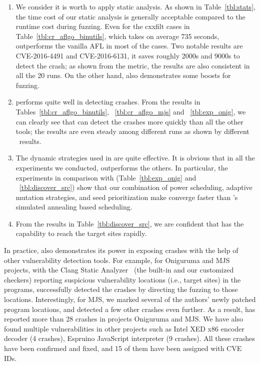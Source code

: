 \begin{enumerate}[\textbf{RQ}1]
    \item  We consider it is worth to apply static analysis. As shown in Table~\ref{tbl:stats}, the time cost of our static analysis is generally acceptable compared to the runtime cost during fuzzing. Even for the cxxfilt cases in Table~\ref{tbl:cr_aflgo_binutils}, which takes on average 735 seconds, \dFOT outperforms the vanilla AFL in most of the cases. Two notable results are CVE-2016-4491 and CVE-2016-6131, it saves roughly 2000s and 9000s to detect the crash; as shown from the {\alz} metric, the results are also consistent in all the 20 runs. On the other hand, \dFOT also demonstrates some boosts for fuzzing.
    \item  \dFOT performs quite well in detecting crashes. From the results in Tables~\ref{tbl:cr_aflgo_binutils}, ~\ref{tbl:cr_aflgo_mjs} and ~\ref{tbl:exp_onig}, we can clearly see that \dFOT can detect the crashes more quickly than all the other tools; the results are even steady among different runs as shown by different {\alz}~results.
    \item  The dynamic strategies used in \dFOT are quite effective. It is obvious that in all the experiments we conducted, \dFOT outperforms the others. In particular, the  experiments in comparison with \dGO (Table~\ref{tbl:exp_onig} and ~\ref{tbl:discover_src}) show that our combination of power scheduling, adaptive mutation strategies, and seed prioritization make \dFOT converge faster than \aflgo's simulated annealing based scheduling.
    \item  From the results in Table~\ref{tbl:discover_src}, we are confident that \dFOT has the capability to reach the target sites rapidly.
\end{enumerate}

In practice, \dFOT also demonstrates its power in exposing crashes with the help of other vulnerability detection tools. For example, for Oniguruma and MJS projects, with the Clang Static Analyzer~\cite{csa} (the built-in and our customized checkers) reporting suspicious vulnerability locations (i.e., target sites) in the programs, \dFOT successfully detected the crashes by directing the fuzzing to those locations. Interestingly, for MJS, we marked several of the authors' newly patched program locations, and detected a few other crashes even further. As a result, \dFOT has reported more than 28 crashes in projects Oniguruma and MJS. We have also found multiple vulnerabilities in other projects such as Intel XED x86 encoder decoder (4 crashes), Espruino JavaScript interpreter (9 crashes).  All these crashes have been confirmed and fixed, and 15 of them have been assigned with CVE IDs. 

